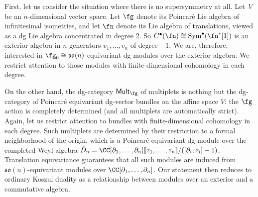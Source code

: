 \documentclass[10pt,a4paper]{amsart}
\numberwithin{equation}{section}
\def\cat#1{\ensuremath{\mathsf{#1}}}
\DeclareMathOperator{\Mult}{\cat{Mult}}
\DeclareMathOperator{\Sym}{Sym}
\begin{document}
\begin{eg}
	First, let us consider the situation where there is no supersymmetry at all. Let~$V$ be an $n$-dimensional vector space. Let $\fg$ denote its Poincar\'e Lie algebra of infinitesimal isometries, and let $\fn$ denote its Lie algebra of translations, viewed as a dg Lie algebra concentrated in degree 2. So $C^\bullet(\fn) \cong \Sym^\bullet(\fn^*[1])$ is an exterior algebra in $n$ generators $v_1, \ldots, v_n$ of degree $-1$. We are, therefore, interested in $\fg_0 \cong \mathfrak{so}(n)$-equivariant dg-modules over the exterior algebra. We restrict attention to those modules with finite-dimensional cohomology in each degree.
	
	On the other hand, the dg-category $\Mult_{\fg}$ of multiplets is nothing but the dg-category of Poincar\'e equivariant dg-vector bundles on the affine space $V$: the $\fg$ action is completely determined (and all multiplets are automatically strict). Again, let us restrict attention to bundles with finite-dimensional cohomology in each degree. Such multiplets are determined by their restriction to a formal neighborhood of the origin, which is a Poincar\'e equivariant dg-module over the completed Weyl algebra $\hat D_n = \CC[\partial_1, \ldots, \partial_n][\![z_1, \ldots, z_n]\!]/([\partial_i, z_i]-1)$. Translation equivariance guarantees that all such modules are induced from $\mathfrak{so}(n)$-equivariant modules over $\CC[\partial_1, \ldots, \partial_n]$. Our statement then reduces to ordinary Koszul duality as a relationship between modules over an exterior and a commutative algebra.
\end{eg}
\end{document}
